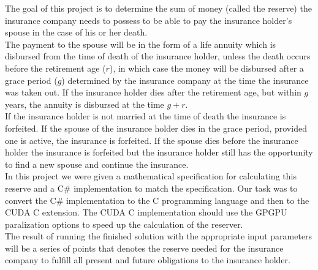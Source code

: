 
The goal of this project is to determine the sum of money (called the reserve) the insurance company needs to possess to be able to pay the insurance holder's spouse in the case of his or her death. \\

The payment to the spouse will be in the form of a life annuity which is disbursed from the time of death of the insurance holder, unless the death occurs before the retirement age ($r$), in which case the money will be disbursed after a grace period ($g$) determined by the insurance company at the time the insurance was taken out. If the insurance holder dies after the retirement age, but within $g$ years, the annuity is disbursed at the time $g + r$. \\

If the insurance holder is not married at the time of death the insurance is forfeited. If the spouse of the insurance holder dies in the grace period, provided one is active, the insurance is forfeited. If the spouse dies before the insurance holder the insurance is forfeited but the insurance holder still has the opportunity to find a new spouse and continue the insurance. \\

In this project we were given a mathematical specification for calculating this reserve \cite{edlu} and a C\# implementation to match the specification. Our task was to convert the C\# implementation to the C programming language and then to the CUDA C extension. The CUDA C implementation should use the GPGPU paralization options to speed up the calculation of the reserver. \\

The result of running the finished solution with the appropriate input parameters will be a series of points that denotes the reserve needed for the insurance company to fulfill all present and future obligations to the insurance holder.


